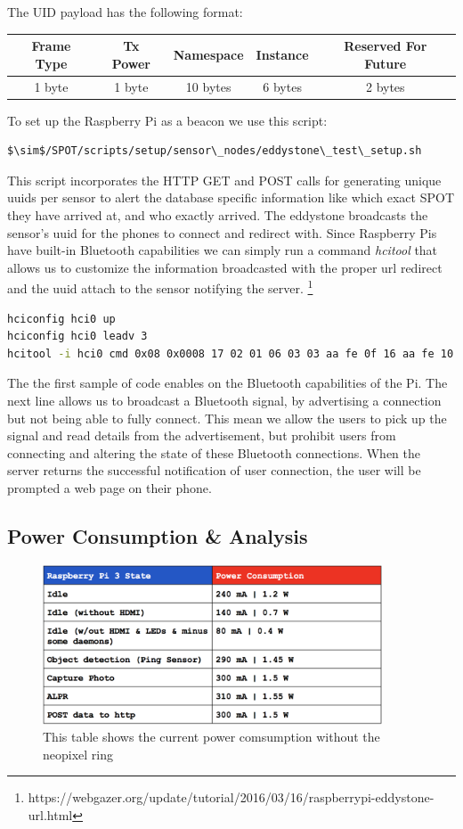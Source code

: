 The UID payload has the following format:
\begin{center}
\begin{tabular}{ |c|c|c|c|c| } 
 \hline
 Frame Type & Tx Power & Namespace & Instance & Reserved For Future \\ 
 \hline
 1 byte & 1 byte & 10 bytes & 6 bytes & 2 bytes \\ 
 \hline
\end{tabular}
\end{center}
To set up the Raspberry Pi as a beacon we use this script:
\begin{lstlisting}[language=bash]
$\sim$/SPOT/scripts/setup/sensor\_nodes/eddystone\_test\_setup.sh
\end{lstlisting}
This script incorporates the HTTP GET and POST calls for generating unique uuids per sensor to alert the database specific information like which exact SPOT they have arrived at, and who exactly arrived. 
The eddystone broadcasts the sensor’s uuid for the phones to connect and redirect with.
Since Raspberry Pis have built-in Bluetooth capabilities we can simply run a command \textit{hcitool} that allows us to customize the information broadcasted with the proper url redirect and the uuid attach to the sensor notifying the server. \footnote{https://webgazer.org/update/tutorial/2016/03/16/raspberrypi-eddystone-url.html}

\begin{lstlisting}[language=bash]
hciconfig hci0 up
hciconfig hci0 leadv 3
hcitool -i hci0 cmd 0x08 0x0008 17 02 01 06 03 03 aa fe 0f 16 aa fe 10 00 02 77 65 62 67 61 7a 65 72 08 00 00 00 00 00 00 00 00
\end{lstlisting}

The the first sample of code enables on the Bluetooth capabilities of the Pi.
The next line allows us to broadcast a Bluetooth signal, by advertising a connection but not being able to fully connect.
This mean we allow the users to pick up the signal and read details from the advertisement, but prohibit users from connecting and altering the state of these Bluetooth connections.
When the server returns the successful notification of user connection, the user will be prompted a web page on their phone.

\subsection{Power Consumption  \& Analysis}
\begin{figure}[ht!]
\centering
\includegraphics[width=0.9\textwidth]{pictures/Pipower.png}
\caption{This table shows the current power comsumption without the neopixel ring}
\end{figure}

